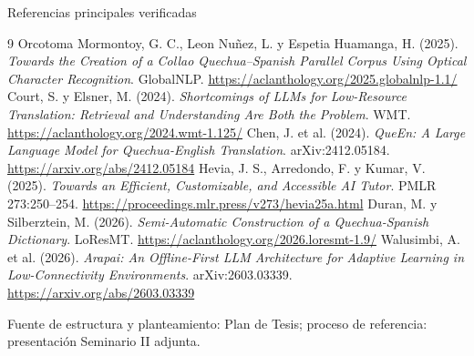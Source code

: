 \documentclass[aspectratio=169,10pt,spanish]{beamer}
\begin{document}
\begin{frame}{Referencias principales verificadas}
\scriptsize
{}
\begin{thebibliography}{9}
 Orcotoma Mormontoy, G. C., Leon Nuñez, L. y Espetia Huamanga, H. (2025). \emph{Towards the Creation of a Collao Quechua--Spanish Parallel Corpus Using Optical Character Recognition}. GlobalNLP. \url{https://aclanthology.org/2025.globalnlp-1.1/}
 Court, S. y Elsner, M. (2024). \emph{Shortcomings of LLMs for Low-Resource Translation: Retrieval and Understanding Are Both the Problem}. WMT. \url{https://aclanthology.org/2024.wmt-1.125/}
 Chen, J. et al. (2024). \emph{QueEn: A Large Language Model for Quechua-English Translation}. arXiv:2412.05184. \url{https://arxiv.org/abs/2412.05184}
 Hevia, J. S., Arredondo, F. y Kumar, V. (2025). \emph{Towards an Efficient, Customizable, and Accessible AI Tutor}. PMLR 273:250--254. \url{https://proceedings.mlr.press/v273/hevia25a.html}
 Duran, M. y Silberztein, M. (2026). \emph{Semi-Automatic Construction of a Quechua-Spanish Dictionary}. LoResMT. \url{https://aclanthology.org/2026.loresmt-1.9/}
 Walusimbi, A. et al. (2026). \emph{Arapai: An Offline-First LLM Architecture for Adaptive Learning in Low-Connectivity Environments}. arXiv:2603.03339. \url{https://arxiv.org/abs/2603.03339}
\end{thebibliography}
\vspace{-0.1cm}
\centering\tiny Fuente de estructura y planteamiento: Plan de Tesis; proceso de referencia: presentación Seminario II adjunta.
\end{frame}
\end{document}
